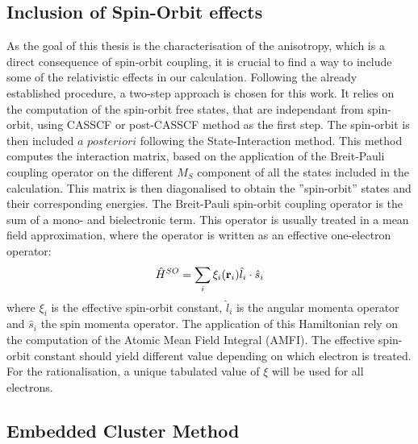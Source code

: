 \documentclass[10pt]{report}
\numberwithin{equation}{section}
\begin{document}
\subsection{Inclusion of Spin-Orbit effects}

As the goal of this thesis is the characterisation of the anisotropy, which is a direct consequence of spin-orbit coupling, it is crucial to find a way to include some of the relativistic effects in our calculation.
Following the already established procedure, a two-step approach is chosen for this work.
It relies on the computation of the spin-orbit free states, that are independant from spin-orbit, using CASSCF or post-CASSCF method as the first step.
The spin-orbit is then included $a$ $posteriori$ following the State-Interaction method.
This method computes the interaction matrix, based on the application of the Breit-Pauli coupling operator on the different $M_S$ component of all the states included in the calculation.
This matrix is then diagonalised to obtain the ''spin-orbit'' states and their corresponding energies.
The Breit-Pauli spin-orbit coupling operator is the sum of a mono- and bielectronic term.
This operator is usually treated in a mean field approximation, where the operator is written as an effective one-electron operator:
\begin{equation}
    \hat{H}^{SO}=\sum_{i} \xi_i(\vb r_i) \hat{l}_i \cdot \hat{s}_i
\end{equation}
where $\xi_i$ is the effective spin-orbit constant, $\hat{l}_i$ is the angular momenta operator and $\hat{s}_i$ the spin momenta operator.
The application of this Hamiltonian rely on the computation of the Atomic Mean Field Integral (AMFI).
The effective spin-orbit constant should yield different value depending on which electron is treated.
For the rationalisation, a unique tabulated value of $\xi$ will be used for all electrons.

\subsection{Embedded Cluster Method}
\end{document}
